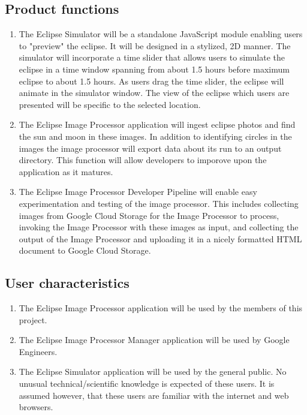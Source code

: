 \documentclass[10pt, onecolumn, draftclsnofoot, letterpaper, compsoc]{IEEEtran}
\begin{document}
\subsection{Product functions}
	\begin{enumerate}
		\item The Eclipse Simulator will be a standalone JavaScript
		module enabling users to "preview" the eclipse. It will be
		designed in a stylized, 2D manner. The simulator will
		incorporate a time slider that allows users to simulate the
		eclipse in a time window spanning from about 1.5 hours before maximum
        eclipse to about 1.5 hours. As users drag the time
		slider, the eclipse will animate in the simulator window.
		The view of the eclipse which users are presented will be
		specific to the selected location.

		\item The Eclipse Image Processor application will ingest eclipse
		photos and find the sun and moon in these images. In addition to
        identifying circles in the images the image processor will export
        data about its run to an output directory. This function will allow
        developers to imporove upon the application as it matures.

		\item The Eclipse Image Processor Developer Pipeline will enable easy
        experimentation and testing of the image processor. This includes
		collecting images from Google Cloud Storage for the Image Processor to process,
		invoking the Image Processor with these images as input, and collecting
		the output of the Image Processor and uploading it in a nicely formatted
        HTML document to Google Cloud Storage. 

	\end{enumerate}

\subsection{User characteristics}
	\begin{enumerate}
		\item The Eclipse Image Processor application will be used by
			 the members of this project.

		\item The Eclipse Image Processor Manager application will be used by
			Google Engineers.

		\item The Eclipse Simulator application will be used by the
			general public. No unusual technical/scientific knowledge is
			expected of these users. It is assumed however, that these users
			are familiar with the internet and web browsers.
	\end{enumerate}
\end{document}
